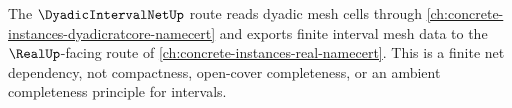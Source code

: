 The $\DyadicIntervalNetUp$ route reads dyadic mesh cells through \autoref{ch:concrete-instances-dyadicratcore-namecert} and exports finite interval mesh data to the $\RealUp$-facing route of \autoref{ch:concrete-instances-real-namecert}. This is a finite net dependency, not compactness, open-cover completeness, or an ambient completeness principle for intervals.
